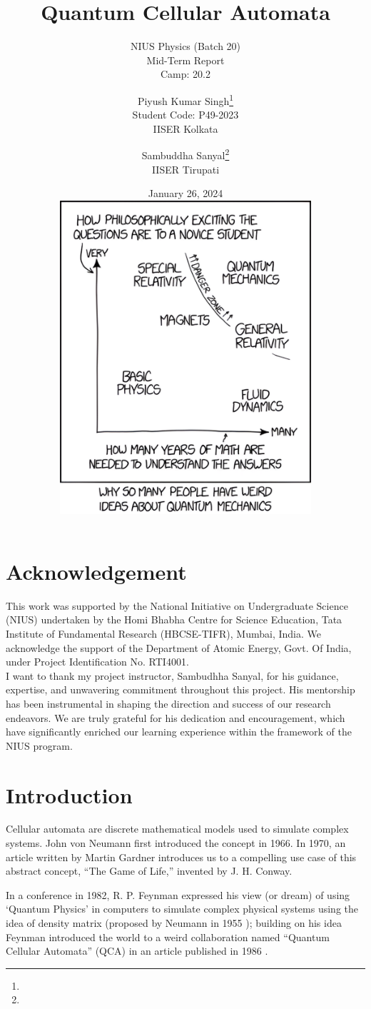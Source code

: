 \documentclass[11pt, oneside, listof=totoc]{scrbook}
\title{Quantum Cellular Automata}
\subtitle{NIUS Physics (Batch 20) \\ Mid-Term Report \\ Camp: 20.2}
\author{
    Piyush Kumar Singh\thanks{\mailto{pks22ms027@iiserkol.ac.in}} \\ {\large Student Code: P49-2023} \\ {\large IISER Kolkata} 
    \and
    Sambuddha Sanyal\thanks{\mailto{sambuddha.sanyal@iisertirupati.ac.in}} \\ {\large IISER Tirupati}
}
\date{
    January 26, 2024\\[3ex]
    \includegraphics[width = 0.7\textwidth]{quantum-xkcd-better.png}
}
\begin{document}
\frontmatter
\begin{titlepage}
    \let\newpage\relax%
    \singhtitle
\end{titlepage}

\chapter*{Acknowledgement}

{\large\noindent
    This work was supported by the National Initiative on Undergraduate Science (NIUS) undertaken
    by the Homi Bhabha Centre for Science Education, Tata Institute of Fundamental Research
    (HBCSE-TIFR), Mumbai, India. We acknowledge the support of the Department of Atomic
    Energy, Govt. Of India, under Project Identification No. RTI4001.\\

    I want to thank my project instructor, Sambudhha Sanyal, for his guidance, expertise, and unwavering commitment throughout this project. His mentorship has been instrumental in shaping the direction and success of our research endeavors. We are truly grateful for his dedication and encouragement, which have significantly enriched our learning experience within the framework of the NIUS program.
}

\tableofcontents

\mainmatter

\chapter{Introduction}


Cellular automata are discrete mathematical models used to simulate complex systems. John von Neumann first introduced the concept \cite{Neumann1966} in 1966. In 1970, an article written by Martin Gardner \cite{Gardner1970} introduces us to a compelling use case of this abstract concept, ``The Game of Life,'' invented by J. H. Conway.


In a conference in 1982, R. P. Feynman expressed his view (or dream) of using `Quantum Physics' in computers \cite{Feynman1982} to simulate complex physical systems using the idea of density matrix (proposed by Neumann in 1955 \cite{Neumann2018}); building on his idea Feynman introduced the world to a weird collaboration named ``Quantum Cellular Automata'' (QCA) in an article published in 1986 \cite{Feynman1986}.
\end{document}
